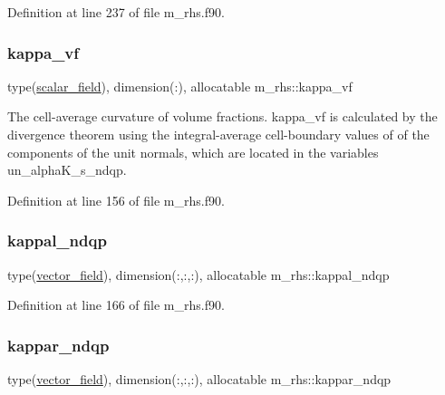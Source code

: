 Definition at line 237 of file m\+\_\+rhs.\+f90.

\mbox{\label{namespacem__rhs_a33739bde53c5512b62c38b0575973897}} 
\subsubsection{\texorpdfstring{kappa\+\_\+vf}{kappa\_vf}}
{\footnotesize\ttfamily type(\hyperlink{structm__derived__types_1_1scalar__field}{scalar\+\_\+field}), dimension(\+:), allocatable m\+\_\+rhs\+::kappa\+\_\+vf}



The cell-\/average curvature of volume fractions. kappa\+\_\+vf is calculated by the divergence theorem using the integral-\/average cell-\/boundary values of of the components of the unit normals, which are located in the variables un\+\_\+alpha\+K\+\_\+s\+\_\+ndqp. 



Definition at line 156 of file m\+\_\+rhs.\+f90.

\mbox{\label{namespacem__rhs_a52c1749bb933147f34129949411d72cd}} 
\subsubsection{\texorpdfstring{kappal\+\_\+ndqp}{kappal\_ndqp}}
{\footnotesize\ttfamily type(\hyperlink{structm__derived__types_1_1vector__field}{vector\+\_\+field}), dimension(\+:,\+:,\+:), allocatable m\+\_\+rhs\+::kappal\+\_\+ndqp}



Definition at line 166 of file m\+\_\+rhs.\+f90.

\mbox{\label{namespacem__rhs_a5114054db70e67aaf7b2c8e71d63c934}} 
\subsubsection{\texorpdfstring{kappar\+\_\+ndqp}{kappar\_ndqp}}
{\footnotesize\ttfamily type(\hyperlink{structm__derived__types_1_1vector__field}{vector\+\_\+field}), dimension(\+:,\+:,\+:), allocatable m\+\_\+rhs\+::kappar\+\_\+ndqp}



